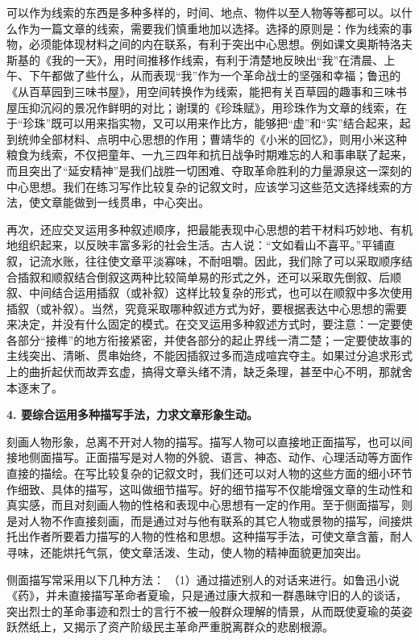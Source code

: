 可以作为线索的东西是多种多样的，时间、地点、物件以至人物等等都可以。以什么作为一篇文章的线索，需要我们慎重地加以选择。选择的原则是：作为线索的事物，必须能体现材料之间的内在联系，有利于突出中心思想。例如课文奥斯特洛夫斯基的《我的一天》，用时间推移作线索，有利于清楚地反映出“我”在清晨、上午、下午都做了些什么，从而表现“我”作为一个革命战士的坚强和幸福；鲁迅的《从百草园到三味书屋》，用空间转换作为线索，能把有关百草园的趣事和三味书屋压抑沉闷的景况作鲜明的对比；谢璞的《珍珠赋》，用珍珠作为文章的线索，在于“珍珠”既可以用来指实物，又可以用来作比方，能够把“虚”和“实”结合起来，起到统帅全部材料、点明中心思想的作用；曹靖华的《小米的回忆》，则用小米这种粮食为线索，不仅把童年、一九三四年和抗日战争时期难忘的人和事串联了起来，而且突出了“延安精神”是我们战胜一切困难、夺取革命胜利的力量源泉这一深刻的中心思想。我们在练习写作比较复杂的记叙文时，应该学习这些范文选择线索的方法，使文章能做到一线贯串，中心突出。

再次，还应交叉运用多种叙述顺序，把最能表现中心思想的若干材料巧妙地、有机地组织起来，以反映丰富多彩的社会生活。古人说：“文如看山不喜平。”平铺直叙，记流水账，往往使文章平淡寡味，不耐咀嚼。因此，我们除了可以采取顺序结合插叙和顺叙结合倒叙这两种比较简单易的形式之外，还可以采取先倒叙、后顺叙、中间结合运用插叙（或补叙）这样比较复杂的形式，也可以在顺叙中多次使用插叙（或补叙）。当然，究竟采取哪种叙述方式为好，要根据表达中心思想的需要来决定，并没有什么固定的模式。在交叉运用多种叙述方式时，要注意：一定要使各部分“接榫”的地方衔接紧密，并使各部分的起止界线一清二楚；一定要使故事的主线突出、清晰、贯串始终，不能因插叙过多而造成喧宾夺主。如果过分追求形式上的曲折起伏而故弄玄虚，搞得文章头绪不清，缺乏条理，甚至中心不明，那就舍本逐末了。

\textbf{4. 要综合运用多种描写手法，力求文章形象生动。}

刻画人物形象，总离不开对人物的描写。描写人物可以直接地正面描写，也可以间接地侧面描写。正面描写是对人物的外貌、语言、神态、动作、心理活动等方面作直接的描绘。在写比较复杂的记叙文时，我们还可以对人物的这些方面的细小环节作细致、具体的描写，这叫做细节描写。好的细节描写不仅能增强文章的生动性和真实感，而且对刻画人物的性格和表现中心思想有一定的作用。至于侧面描写，则是对人物不作直接刻画，而是通过对与他有联系的其它人物或景物的描写，间接烘托出作者所要着力描写的人物的性格和思想。这种描写手法，可使文章含蓄，耐人寻味，还能烘托气氛，使文章活泼、生动，使人物的精神面貌更加突出。

侧面描写常采用以下几种方法：
（1）通过描述别人的对话来进行。如鲁迅小说《药》，并未直接描写革命者夏瑜，只是通过康大叔和一群愚昧守旧的人的谈话，突出烈士的革命事迹和烈士的言行不被一般群众理解的情景，从而既使夏瑜的英姿跃然纸上，又揭示了资产阶级民主革命严重脱离群众的悲剧根源。

